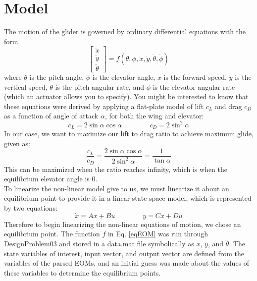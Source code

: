 \documentclass[12pt]{article}
\begin{document}
\section{Model}
The motion of the glider is governed by ordinary differential equations with the form
\begin{equation}
\label{eqEOM}
\begin{bmatrix} \ddot{x} \\ \ddot{y} \\ \ddot{\theta} \end{bmatrix} = f(\theta,\phi,\dot{x},\dot{y},\dot{\theta},\dot{\phi})
\end{equation}
where $\theta$ is the pitch angle, $\phi$ is the elevator angle, $\dot{x}$ is the forward speed, $\dot{y}$ is the vertical speed, $\dot{\theta}$ is the pitch angular rate, and $\dot{\phi}$ is the elevator angular rate (which an actuator allows you to specify). You might be interested to know that these equations were derived by applying a flat-plate model of lift $c_{L}$ and drag $c_{D}$ as a function of angle of attack $\alpha$, for both the wing and elevator:
\begin{equation*}
c_{L} = 2\sin\alpha \cos\alpha
\qquad\qquad
c_{D} = 2\sin^{2}\alpha
\end{equation*}
In our case, we want to maximize our lift to drag ratio to achieve maximum glide, given as: 
\begin{equation}
\label{eqLDR}
\frac{c_{L}}{c_{D}} = \frac{2\sin\alpha \cos\alpha}{2\sin^{2}\alpha} = \frac{1}{\tan\alpha}
\end{equation}
This can be maximized when the ratio reaches infinity, which is when the equilibrium elevator angle is 0. \\
To linearize the non-linear model give to us, we must linearize it about an equilibrium point to provide it in a linear state space model, which is represented by two equations:
\begin{equation}
\label{eqSSM}
\dot{x} = Ax + Bu \qquad \qquad y = Cx + Du
\end{equation}
Therefore to begin linearizing the non-linear equations of motion, we chose an equilibrium point. The function $f$ in Eq. \eqref{eqEOM} was run through DesignProblem03 and stored in a data.mat file symbolically as $\ddot{x}$, $\ddot{y}$, and $\ddot{\theta}$. The state variables of interest, input vector, and output vector are defined from the variables of the parsed EOMs, and an initial guess was made about the values of these variables to determine the equilibrium points.
\end{document}
